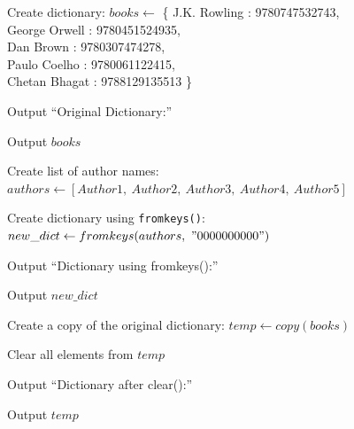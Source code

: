 \begin{algorithm}
\caption{Demonstrate Dictionary Methods with Authors and ISBN Numbers}
\begin{algorithmic}[1]

\STATE Create dictionary:
\STATE $books \gets$
\{
J.K. Rowling : 9780747532743,\\
George Orwell : 9780451524935,\\
Dan Brown : 9780307474278,\\
Paulo Coelho : 9780061122415,\\
Chetan Bhagat : 9788129135513
\}

\STATE Output ``Original Dictionary:''

\STATE Output $books$

\STATE Create list of author names:
\STATE $authors \gets [Author1,\ Author2,\ Author3,\ Author4,\ Author5]$

\STATE Create dictionary using \texttt{fromkeys()}:
\STATE $new\_dict \gets fromkeys(authors,\ "0000000000")$

\STATE Output ``Dictionary using fromkeys():''

\STATE Output $new\_dict$

\STATE Create a copy of the original dictionary:
\STATE $temp \gets copy(books)$

\STATE Clear all elements from $temp$

\STATE Output ``Dictionary after clear():''

\STATE Output $temp$

\end{algorithmic}
\end{algorithm}